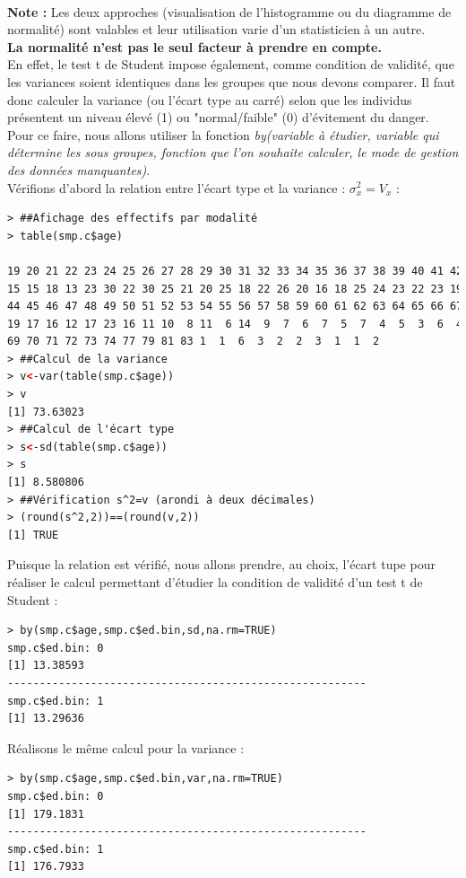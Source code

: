 \\
\textbf{Note : } Les deux approches (visualisation de l'histogramme ou du diagramme de normalité) sont valables et leur utilisation varie d'un statisticien à un autre.\newline
\\
\textbf{La normalité n'est pas le seul facteur à prendre en compte.}\newline
\\
En effet, le test t de Student impose également, comme condition de validité, que les variances soient identiques dans les groupes que nous devons comparer.\newline
Il faut donc calculer la variance (ou l'écart type au carré) selon que les individus présentent un niveau élevé (1) ou "normal/faible" (0) d'évitement du danger. \newline
Pour ce faire, nous allons utiliser la fonction \textit{by(variable à étudier, variable qui détermine les sous groupes, fonction que l'on souhaite calculer, le mode de gestion des données manquantes)}.\newline
\\
Vérifions d'abord la relation entre l'écart type et la variance : $\sigma^{2}_{x}=V_{x}$ : 
\begin{lstlisting}[language=html]
> ##Afichage des effectifs par modalité
> table(smp.c$age)

19 20 21 22 23 24 25 26 27 28 29 30 31 32 33 34 35 36 37 38 39 40 41 42 43 
15 15 18 13 23 30 22 30 25 21 20 25 18 22 26 20 16 18 25 24 23 22 23 19 17 
44 45 46 47 48 49 50 51 52 53 54 55 56 57 58 59 60 61 62 63 64 65 66 67 68 
19 17 16 12 17 23 16 11 10  8 11  6 14  9  7  6  7  5  7  4  5  3  6  4  2 
69 70 71 72 73 74 77 79 81 83 1  1  6  3  2  2  3  1  1  2 
> ##Calcul de la variance
> v<-var(table(smp.c$age))
> v
[1] 73.63023
> ##Calcul de l'écart type
> s<-sd(table(smp.c$age))
> s
[1] 8.580806
> ##Vérification s^2=v (arondi à deux décimales)
> (round(s^2,2))==(round(v,2))
[1] TRUE
\end{lstlisting}
Puisque la relation est vérifié, nous allons prendre, au choix, l'écart tupe pour réaliser le calcul permettant d'étudier la condition de validité d'un test t de Student : 
\begin{lstlisting}[language=html]
> by(smp.c$age,smp.c$ed.bin,sd,na.rm=TRUE)
smp.c$ed.bin: 0
[1] 13.38593
-------------------------------------------------------- 
smp.c$ed.bin: 1
[1] 13.29636
\end{lstlisting}
Réalisons le même calcul pour la variance : 
\begin{lstlisting}[language=html]
> by(smp.c$age,smp.c$ed.bin,var,na.rm=TRUE)
smp.c$ed.bin: 0
[1] 179.1831
-------------------------------------------------------- 
smp.c$ed.bin: 1
[1] 176.7933
\end{lstlisting}
